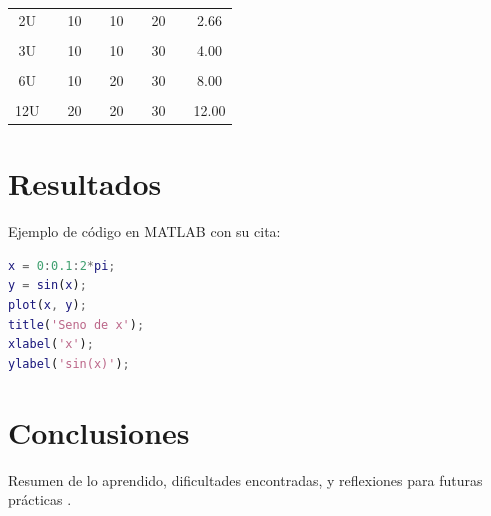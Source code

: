 \documentclass[12pt,a4paper]{article}
\begin{document}
\begin{table}[htp]
\begin{center}
\begin{tabular}{clclclclc}
2U                   &  & 10                                                   &  & 10                                                   &  & 20                                                   &  & 2.66                                                \\
\multicolumn{1}{l}{} &  & \multicolumn{1}{l}{}                                 &  & \multicolumn{1}{l}{}                                 &  & \multicolumn{1}{l}{}                                 &  & \multicolumn{1}{l}{}                                \\
3U                   &  & 10                                                   &  & 10                                                   &  & 30                                                   &  & 4.00                                                \\
\multicolumn{1}{l}{} &  & \multicolumn{1}{l}{}                                 &  & \multicolumn{1}{l}{}                                 &  & \multicolumn{1}{l}{}                                 &  & \multicolumn{1}{l}{}                                \\
6U                   &  & 10                                                   &  & 20                                                   &  & 30                                                   &  & 8.00                                                \\
\multicolumn{1}{l}{} &  & \multicolumn{1}{l}{}                                 &  & \multicolumn{1}{l}{}                                 &  & \multicolumn{1}{l}{}                                 &  & \multicolumn{1}{l}{}                                \\
12U                  &  & 20                                                   &  & 20                                                   &  & 30                                                   &  & 12.00                                               \\ \hline
\end{tabular}
\end{center}
\end{table}

\section{Resultados}
Ejemplo de código en MATLAB con su cita:

\begin{lstlisting}[language=Matlab, caption={Vectorización de datos}]
x = 0:0.1:2*pi;
y = sin(x);
plot(x, y);
title('Seno de x');
xlabel('x');
ylabel('sin(x)');
\end{lstlisting}

\newpage



\section{Conclusiones}
Resumen de lo aprendido, dificultades encontradas, y reflexiones para futuras prácticas \cite{Blokhin2017}.

\newpage    


\end{document}
